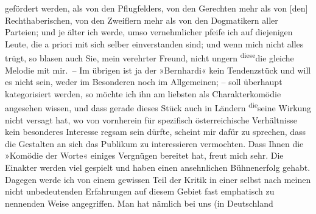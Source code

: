 \begin{ledgroupsized}[t]{13cm}
               gefördert werden, als von den Pflugfelders, von \introOben{}den\introOben{} Gerechten mehr als von
                  {[}den{]} Rechthaberischen, von den Zweiflern mehr als von den
               Dogmatikern aller Parteien\introOben{};\introOben{} und je älter ich werde, umso
               vernehmlicher pfeife ich auf diejenigen Leute, die a
               priori mit sich selber einverstanden sind; und wenn mich nicht alles trügt, so blasen
               auch Sie, mein verehrter Freund, nicht ungern \substVorne{}\textsuperscript{diese}\substDazwischen{}die gleiche\substHinten{} Melodie \introOben{}mit mir\introOben{}. – Im übrigen ist ja der »Bernhardi« kein Tendenzstück und will es nicht sein,
               weder im Besonderen noch im Allgemeinen; – soll überhaupt kategorisiert werden, so
               möchte ich ihn am liebsten als Charakterkomödie angesehen wissen, und dass gerade
               dieses Stück auch in Ländern \substVorne{}\textsuperscript{die}\substDazwischen{}seine\substHinten{} Wirkung nicht versagt hat, wo von vornherein für spezifisch österreichische Verhältnisse kein besonderes Interesse regsam
               sein dürfte, scheint mir dafür zu sprechen, dass die Gestalten an sich das Publikum
               zu interessieren vermochten.\pend
           \pstart
           {\pb}Dass Ihnen die »Komödie der Worte« einiges Vergnügen bereitet hat, freut mich sehr. Die
               Einakter werden viel gespielt und haben einen ansehnlichen Bühnenerfolg gehabt.
               Dagegen werde ich von einem gewissen Teil der Kritik in einer selbst nach meinen
               nicht unbedeutenden Erfahrungen auf diesem Gebiet fast emphatisch zu nennenden Weise
               angegriffen. Man hat nämlich bei uns (in Deutschland

\end{ledgroupsized}
